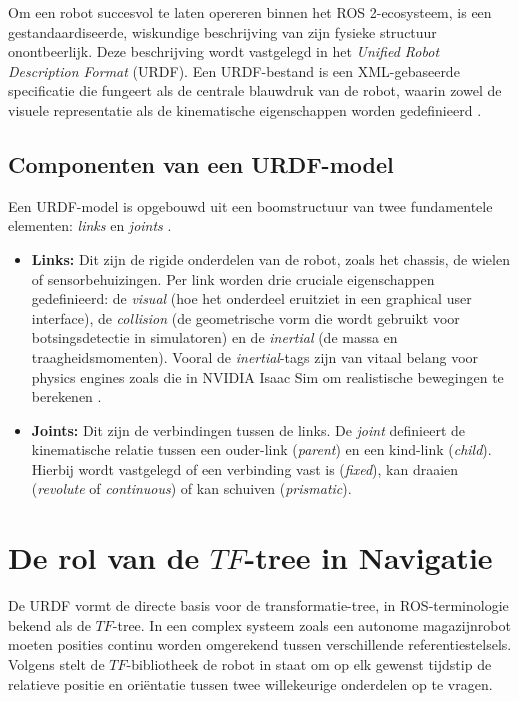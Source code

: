 Om een robot succesvol te laten opereren binnen het ROS 2-ecosysteem, is een gestandaardiseerde, wiskundige beschrijving van zijn fysieke structuur onontbeerlijk. Deze beschrijving wordt vastgelegd in het \textit{Unified Robot Description Format} (URDF). Een URDF-bestand is een XML-gebaseerde specificatie die fungeert als de centrale blauwdruk van de robot, waarin zowel de visuele representatie als de kinematische eigenschappen worden gedefinieerd \autocite{ROSCommunity2023}.

\subsection{Componenten van een URDF-model}
Een URDF-model is opgebouwd uit een boomstructuur van twee fundamentele elementen: \textit{links} en \textit{joints} \autocite{Joseph2018}.

\begin{itemize}
\item \textbf{Links:} Dit zijn de rigide onderdelen van de robot, zoals het chassis, de wielen of sensorbehuizingen. Per link worden drie cruciale eigenschappen gedefinieerd: de \textit{visual} (hoe het onderdeel eruitziet in een graphical user interface), de \textit{collision} (de geometrische vorm die wordt gebruikt voor botsingsdetectie in simulatoren) en de \textit{inertial} (de massa en traagheidsmomenten). Vooral de \textit{inertial}-tags zijn van vitaal belang voor physics engines zoals die in NVIDIA Isaac Sim om realistische bewegingen te berekenen \autocite{Joseph2018}.
\item \textbf{Joints:} Dit zijn de verbindingen tussen de links. De \textit{joint} definieert de kinematische relatie tussen een ouder-link (\textit{parent}) en een kind-link (\textit{child}). Hierbij wordt vastgelegd of een verbinding vast is (\textit{fixed}), kan draaien (\textit{revolute} of \textit{continuous}) of kan schuiven (\textit{prismatic}).
\end{itemize}

\section{De rol van de $TF$-tree in Navigatie}
\label{sec:tf_tree_navigatie}
De URDF vormt de directe basis voor de transformatie-tree, in ROS-terminologie bekend als de $TF$-tree. In een complex systeem zoals een autonome magazijnrobot moeten posities continu worden omgerekend tussen verschillende referentiestelsels. Volgens \textcite{Quigley2015} stelt de $TF$-bibliotheek de robot in staat om op elk gewenst tijdstip de relatieve positie en oriëntatie tussen twee willekeurige onderdelen op te vragen.

